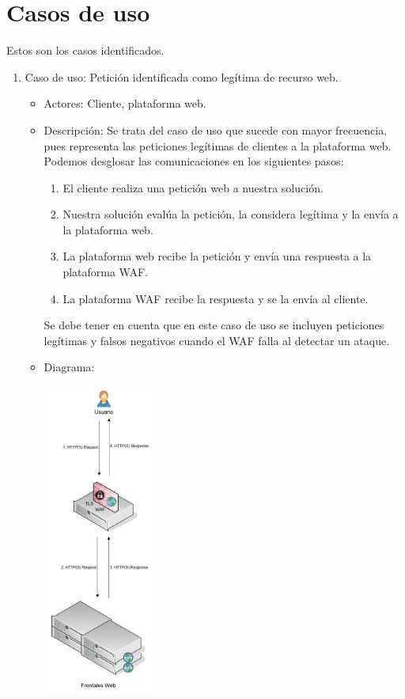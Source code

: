 \section{Casos de uso}
\par Estos son los casos identificados.
\begin{enumerate}
  \item Caso de uso: Petición identificada como legítima de recurso web.
    \begin{itemize}
      \item Actores: Cliente, plataforma web.
      \item Descripción: Se trata del caso de uso que sucede con mayor frecuencia, pues representa las peticiones legítimas de clientes a la plataforma web. Podemos desglosar las comunicaciones en los siguientes pasos:
        \begin{enumerate}
          \item El cliente realiza una petición web a nuestra solución.
          \item Nuestra solución evalúa la petición, la considera legítima y la envía a la plataforma web.
          \item La plataforma web recibe la petición y envía una respuesta a la plataforma WAF.
          \item La plataforma WAF recibe la respuesta y se la envía al cliente.
        \end{enumerate}
        \par Se debe tener en cuenta que en este caso de uso se incluyen peticiones legítimas y falsos negativos cuando el WAF falla al detectar un ataque.
      \item Diagrama:
        \begin{center}
          \label{fig:CasoUso1}
          \includegraphics[width=0.3\textwidth]{fig/UseCase1}

\end{center}
\end{itemize}
\end{enumerate}
